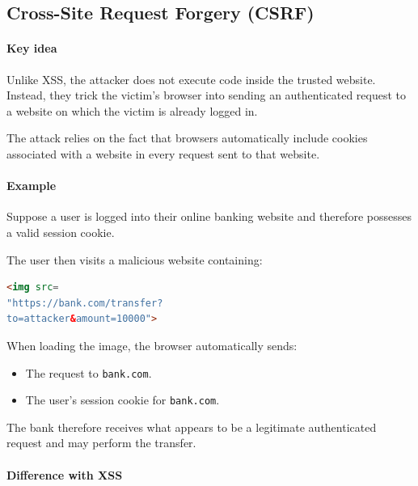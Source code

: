 \subsection{Cross-Site Request Forgery (CSRF)}

\paragraph{Key idea}

Unlike XSS, the attacker does not execute code inside the trusted website. Instead, they trick the victim's browser into sending an authenticated request to a website on which the victim is already logged in.

\vspace{0.3em}

The attack relies on the fact that browsers automatically include cookies associated with a website in every request sent to that website.

\paragraph{Example}

Suppose a user is logged into their online banking website and therefore possesses a valid session cookie.

\vspace{0.3em}

The user then visits a malicious website containing:

\begin{lstlisting}[language=HTML]
<img src=
"https://bank.com/transfer?
to=attacker&amount=10000">
\end{lstlisting}

When loading the image, the browser automatically sends:

\begin{itemize}
    \item The request to \texttt{bank.com}.
    \item The user's session cookie for \texttt{bank.com}.
\end{itemize}

The bank therefore receives what appears to be a legitimate authenticated request and may perform the transfer.

\paragraph{Difference with XSS}

